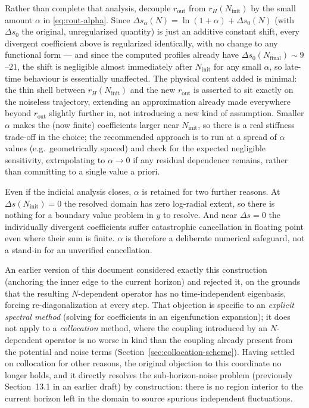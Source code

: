 \documentclass[a4paper,11pt]{article}
\newcommand{\semibold}[1]{{\fontseries{b}\selectfont{#1}}}
\newenvironment{panel}{\begin{tcolorbox}[enhanced,breakable,colback=gray!10,colframe=gray!30]\small}{\end{tcolorbox}}
\newcommand{\Ny}{N}                          %
\newcommand{\Ninit}{N_{\mathrm{init}}}       %
\newcommand{\Nfinal}{N_{\mathrm{final}}}     %
\newcommand{\rad}{r}                         %
\newcommand{\yco}{y}                         %
\newcommand{\rout}{\rad_{\mathrm{out}}}      %
\newcommand{\rH}{\rad_H}                     %
\newcommand{\Deltas}{\Delta s}                %
\begin{document}
\begin{panel}
Rather than complete that analysis, decouple $\rout$ from $\rH(\Ninit)$ by
the small amount $\alpha$ in \eqref{eq:rout-alpha}. Since
$\Deltas_\alpha(\Ny) = \ln(1+\alpha) + \Deltas_0(\Ny)$ (with $\Deltas_0$ the
original, unregularized quantity) is just an additive constant shift, every
divergent coefficient above is regularized identically, with no change to
any functional form --- and since the computed profiles already have
$\Deltas_0(\Nfinal)\sim9$--$21$, the shift is negligible almost immediately
after $\Ninit$ for any small $\alpha$, so late-time behaviour is
essentially unaffected. The physical content added is minimal: the thin
shell between $\rH(\Ninit)$ and the new $\rout$ is asserted to sit exactly
on the noiseless trajectory, extending an approximation already made
everywhere beyond $\rout$ slightly further in, not introducing a new kind
of assumption. Smaller $\alpha$ makes the (now finite) coefficients larger
near $\Ninit$, so there is a real stiffness trade-off in the choice; the
recommended approach is to run at a spread of $\alpha$ values (e.g.\
geometrically spaced) and check for the expected negligible sensitivity,
extrapolating to $\alpha\to0$ if any residual dependence remains, rather
than committing to a single value a priori.

Even if the indicial analysis closes, $\alpha$ is retained for two further
reasons. At $\Deltas(\Ninit)=0$ the resolved domain has zero log-radial
extent, so there is nothing for a boundary value problem in $\yco$ to
resolve. And near $\Deltas=0$ the individually divergent coefficients
suffer catastrophic cancellation in floating point even where their sum is
finite. $\alpha$ is therefore a deliberate numerical safeguard, not a
stand-in for an unverified cancellation.
\end{panel}

\begin{panel}
\semibold{This was the previously-rejected alternative --- now viable.} An
earlier version of this document considered exactly this construction
(anchoring the inner edge to the current horizon) and rejected it, on the
grounds that the resulting $\Ny$-dependent operator has no time-independent
eigenbasis, forcing re-diagonalization at every step. That objection is
specific to an \emph{explicit spectral method} (solving for coefficients
in an eigenfunction expansion); it does not apply to a \emph{collocation}
method, where the coupling introduced by an $\Ny$-dependent operator is no
worse in kind than the coupling already present from the potential and
noise terms (Section~\ref{sec:collocation-scheme}). Having settled on
collocation for other reasons, the original objection to this coordinate
no longer holds, and it directly resolves the sub-horizon-noise problem
(previously Section~13.1 in an earlier draft) by construction: there is no
region interior to the current horizon left in the domain to source
spurious independent fluctuations.
\end{panel}
\end{document}
